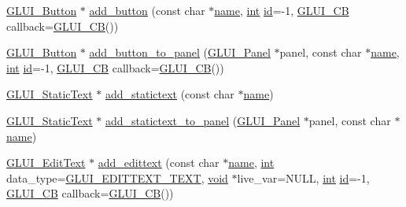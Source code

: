 \begin{DoxyCompactItemize}
\item 
\hyperlink{class_g_l_u_i___button}{G\+L\+U\+I\+\_\+\+Button} $\ast$ \hyperlink{class_g_l_u_i_a7566d52c3181c92de8b2039aefd88b1e}{add\+\_\+button} (const char $\ast$\hyperlink{glext_8h_ad977737dfc9a274a62741b9500c49a32}{name}, \hyperlink{wglext_8h_a500a82aecba06f4550f6849b8099ca21}{int} \hyperlink{glext_8h_a58c2a664503e14ffb8f21012aabff3e9}{id}=-\/1, \hyperlink{class_g_l_u_i___c_b}{G\+L\+U\+I\+\_\+\+C\+B} callback=\hyperlink{class_g_l_u_i___c_b}{G\+L\+U\+I\+\_\+\+C\+B}())
\item 
\hyperlink{class_g_l_u_i___button}{G\+L\+U\+I\+\_\+\+Button} $\ast$ \hyperlink{class_g_l_u_i_af9039fe3c9c23f316426a654ea309383}{add\+\_\+button\+\_\+to\+\_\+panel} (\hyperlink{class_g_l_u_i___panel}{G\+L\+U\+I\+\_\+\+Panel} $\ast$panel, const char $\ast$\hyperlink{glext_8h_ad977737dfc9a274a62741b9500c49a32}{name}, \hyperlink{wglext_8h_a500a82aecba06f4550f6849b8099ca21}{int} \hyperlink{glext_8h_a58c2a664503e14ffb8f21012aabff3e9}{id}=-\/1, \hyperlink{class_g_l_u_i___c_b}{G\+L\+U\+I\+\_\+\+C\+B} callback=\hyperlink{class_g_l_u_i___c_b}{G\+L\+U\+I\+\_\+\+C\+B}())
\item 
\hyperlink{class_g_l_u_i___static_text}{G\+L\+U\+I\+\_\+\+Static\+Text} $\ast$ \hyperlink{class_g_l_u_i_ac654d6d6e0f7ace0694ac6641654f04f}{add\+\_\+statictext} (const char $\ast$\hyperlink{glext_8h_ad977737dfc9a274a62741b9500c49a32}{name})
\item 
\hyperlink{class_g_l_u_i___static_text}{G\+L\+U\+I\+\_\+\+Static\+Text} $\ast$ \hyperlink{class_g_l_u_i_a5b60d2e5161b9b8027c833c85888d59e}{add\+\_\+statictext\+\_\+to\+\_\+panel} (\hyperlink{class_g_l_u_i___panel}{G\+L\+U\+I\+\_\+\+Panel} $\ast$panel, const char $\ast$\hyperlink{glext_8h_ad977737dfc9a274a62741b9500c49a32}{name})
\item 
\hyperlink{class_g_l_u_i___edit_text}{G\+L\+U\+I\+\_\+\+Edit\+Text} $\ast$ \hyperlink{class_g_l_u_i_a5b1c456923b46d885a3419aead41cd9b}{add\+\_\+edittext} (const char $\ast$\hyperlink{glext_8h_ad977737dfc9a274a62741b9500c49a32}{name}, \hyperlink{wglext_8h_a500a82aecba06f4550f6849b8099ca21}{int} data\+\_\+type=\hyperlink{glui_8h_a5e7e137e5f35f2859b135d8924719d27}{G\+L\+U\+I\+\_\+\+E\+D\+I\+T\+T\+E\+X\+T\+\_\+\+T\+E\+X\+T}, \hyperlink{wglext_8h_a9e6b7f1933461ef318bb000d6bd13b83}{void} $\ast$live\+\_\+var=N\+U\+L\+L, \hyperlink{wglext_8h_a500a82aecba06f4550f6849b8099ca21}{int} \hyperlink{glext_8h_a58c2a664503e14ffb8f21012aabff3e9}{id}=-\/1, \hyperlink{class_g_l_u_i___c_b}{G\+L\+U\+I\+\_\+\+C\+B} callback=\hyperlink{class_g_l_u_i___c_b}{G\+L\+U\+I\+\_\+\+C\+B}())

\end{DoxyCompactItemize}
